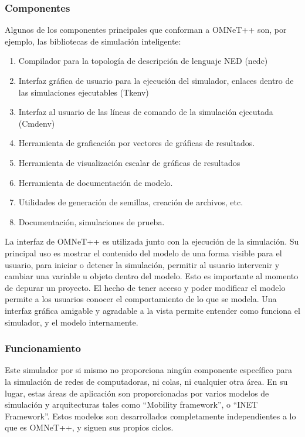 \subsubsection{Componentes}

Algunos de los componentes principales que conforman a OMNeT++ son, por ejemplo, las bibliotecas de simulación inteligente:

\begin{enumerate}
    \item Compilador para la topología de descripción de lenguaje NED (nedc)
    \item Interfaz gráfica de usuario para la ejecución del simulador, enlaces dentro de las simulaciones ejecutables (Tkenv)
    \item Interfaz al usuario de las líneas de comando de la simulación ejecutada (Cmdenv)
    \item Herramienta de graficación por vectores de gráficas de resultados.
    \item Herramienta de visualización escalar de gráficas de resultados
    \item Herramienta de documentación de modelo.
    \item Utilidades de generación de semillas, creación de archivos, etc.
    \item Documentación, simulaciones de prueba.
\end{enumerate}

La interfaz de OMNeT++ es utilizada junto con la ejecución de la simulación. Su principal uso es mostrar el contenido del modelo de una forma visible para el usuario, para iniciar o detener la simulación, permitir al usuario intervenir y cambiar una variable u objeto dentro del modelo. Esto es importante al momento de depurar un proyecto. El hecho de tener acceso y poder modificar el modelo permite a los usuarios conocer el comportamiento de lo que se modela. Una interfaz gráfica amigable y agradable a la vista permite entender como funciona el simulador, y el modelo internamente.

\subsubsection{Funcionamiento}

Este simulador por si mismo no proporciona ningún componente específico para la simulación de redes de computadoras, ni colas, ni cualquier otra área. En su lugar, estas áreas de aplicación son proporcionadas por varios modelos de simulación y arquitecturas tales como ``Mobility framework'', o ``INET Framework''. Estos modelos son desarrollados completamente independientes a lo que es OMNeT++, y siguen sus propios ciclos.

